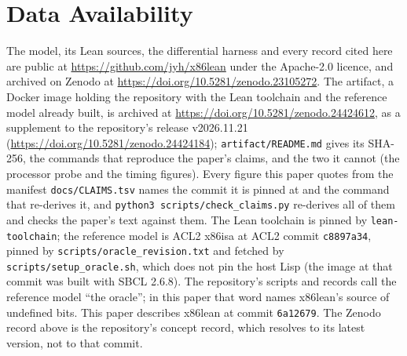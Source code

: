 \documentclass[runningheads]{llncs}
\newcommand{\src}[1]{}  %
\begin{document}
\section*{Data Availability}
The model, its Lean sources, the differential harness and every record cited here are public at
\url{https://github.com/jyh/x86lean} under the Apache-2.0 licence, and archived on Zenodo at
\url{https://doi.org/10.5281/zenodo.23105272}. The artifact, a Docker image holding the repository with the Lean
toolchain and the reference model already built, is archived at
\url{https://doi.org/10.5281/zenodo.24424612}, as a supplement to the repository's release v2026.11.21
(\url{https://doi.org/10.5281/zenodo.24424184}); \texttt{artifact/README.md} gives its SHA-256, the commands that
reproduce the paper's claims, and the two it cannot (the processor probe and the timing figures). Every figure this paper quotes from
the manifest \texttt{docs/CLAIMS.tsv} names the commit it is pinned at and the command that re-derives
it, and \texttt{python3 scripts/\allowbreak check\_\allowbreak claims.py} re-derives all of them and checks the paper's text
against them. The Lean toolchain is pinned by \texttt{lean-toolchain}; the reference model is ACL2
x86isa at ACL2 commit \texttt{c8897a34}, pinned by \texttt{scripts/oracle\_revision.txt} and fetched
by \texttt{scripts/setup\_oracle.sh}, which does not pin the host Lisp (the image at that commit was built
with SBCL 2.6.8). The repository's scripts and records call the reference model ``the oracle''; in
this paper that word names x86lean's source of undefined bits. This paper describes x86lean at commit
\texttt{6a12679}. The Zenodo record above
is the repository's concept record, which resolves to its latest version, not to that commit.
\src{scripts/setup\_oracle.sh (brew install sbcl, unversioned); vendor/acl2/saved\_acl2 exec line reads sbcl/2.6.8 (D250);
LICENSE; lean-toolchain; scripts/oracle\_revision.txt; docs/CLAIMS.tsv[pin\_reference\_model\_short, proof\_sample\_routines]}



\end{document}
